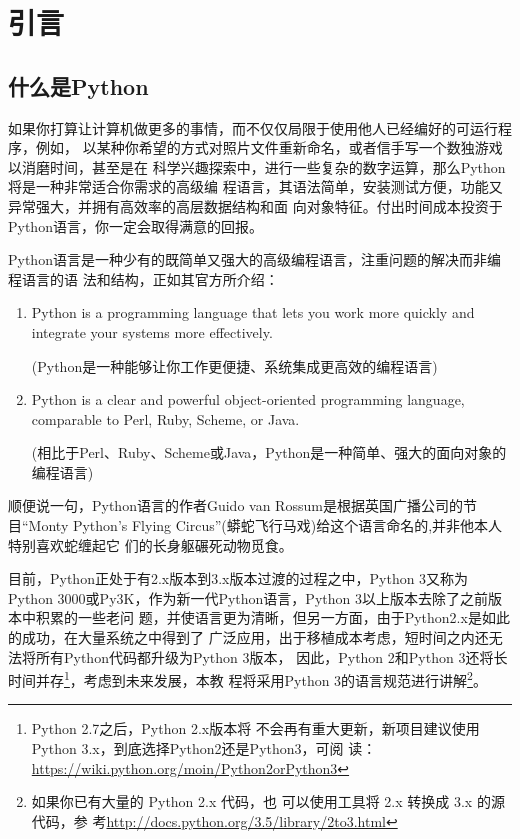 \chapter{引言}

\section{什么是Python}

如果你打算让计算机做更多的事情，而不仅仅局限于使用他人已经编好的可运行程序，例如，
以某种你希望的方式对照片文件重新命名，或者信手写一个数独游戏以消磨时间，甚至是在
科学兴趣探索中，进行一些复杂的数字运算，那么Python将是一种非常适合你需求的高级编
程语言，其语法简单，安装测试方便，功能又异常强大，并拥有高效率的高层数据结构和面
向对象特征。付出时间成本投资于Python语言，你一定会取得满意的回报。

Python语言是一种少有的既简单又强大的高级编程语言，注重问题的解决而非编程语言的语
法和结构，正如其官方所介绍：

\begin{enumerate}
\item Python is a programming language that lets you work more quickly and
integrate your systems more effectively.

(Python是一种能够让你工作更便捷、系统集成更高效的编程语言)

\item Python is a clear and powerful object-oriented programming language,
comparable to Perl, Ruby, Scheme, or Java.

(相比于Perl、Ruby、Scheme或Java，Python是一种简单、强大的面向对象的编程语言)
\end{enumerate}

顺便说一句，Python语言的作者Guido van Rossum是根据英国广播公司的节目``Monty
Python's Flying Circus''(蟒蛇飞行马戏)给这个语言命名的,并非他本人特别喜欢蛇缠起它
们的长身躯碾死动物觅食。

目前，Python正处于有2.x版本到3.x版本过渡的过程之中，Python 3又称为Python
3000或Py3K，作为新一代Python语言，Python 3以上版本去除了之前版本中积累的一些老问
题，并使语言更为清晰，但另一方面，由于Python2.x是如此的成功，在大量系统之中得到了
广泛应用，出于移植成本考虑，短时间之内还无法将所有Python代码都升级为Python 3版本，
因此，Python 2和Python 3还将长时间并存\footnote{Python 2.7之后，Python 2.x版本将
  不会再有重大更新，新项目建议使用Python 3.x，到底选择Python2还是Python3，可阅
  读：\url{https://wiki.python.org/moin/Python2orPython3} }，考虑到未来发展，本教
程将采用Python 3的语言规范进行讲解\footnote{如果你已有大量的 Python 2.x 代码，也
  可以使用工具将 2.x 转换成 3.x 的源代码，参
  考\url{http://docs.python.org/3.5/library/2to3.html}}。



